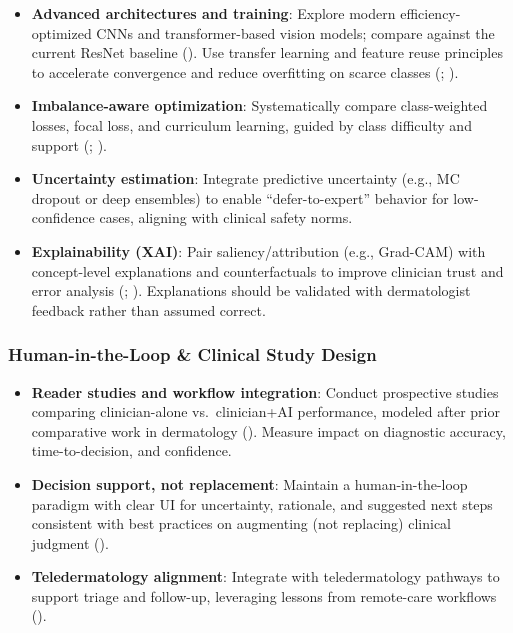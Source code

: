 \documentclass[
  12pt,
  oneside]{article}
\providecommand{\tightlist}{%
  \setlength{\itemsep}{0pt}\setlength{\parskip}{0pt}}
\begin{document}
\begin{itemize}
\tightlist
\item
  \textbf{Advanced architectures and training}: Explore modern
  efficiency-optimized CNNs and transformer-based vision models; compare
  against the current ResNet baseline (). Use transfer learning and feature reuse principles to
  accelerate convergence and reduce overfitting on scarce classes
  (;
  ).
\item
  \textbf{Imbalance-aware optimization}: Systematically compare
  class-weighted losses, focal loss, and curriculum learning, guided by
  class difficulty and support (; ).
\item
  \textbf{Uncertainty estimation}: Integrate predictive uncertainty
  (e.g., MC dropout or deep ensembles) to enable ``defer-to-expert''
  behavior for low-confidence cases, aligning with clinical safety
  norms.
\item
  \textbf{Explainability (XAI)}: Pair saliency/attribution (e.g.,
  Grad-CAM) with concept-level explanations and counterfactuals to
  improve clinician trust and error analysis
  (;
  ). Explanations
  should be validated with dermatologist feedback rather than assumed
  correct.
\end{itemize}

\subsubsection{Human-in-the-Loop \& Clinical Study
Design}\label{human-in-the-loop-clinical-study-design}

\begin{itemize}
\tightlist
\item
  \textbf{Reader studies and workflow integration}: Conduct prospective
  studies comparing clinician-alone vs.~clinician+AI performance,
  modeled after prior comparative work in dermatology
  (). Measure
  impact on diagnostic accuracy, time-to-decision, and confidence.
\item
  \textbf{Decision support, not replacement}: Maintain a
  human-in-the-loop paradigm with clear UI for uncertainty, rationale,
  and suggested next steps consistent with best practices on augmenting
  (not replacing) clinical judgment
  ().
\item
  \textbf{Teledermatology alignment}: Integrate with teledermatology
  pathways to support triage and follow-up, leveraging lessons from
  remote-care workflows ().
\end{itemize}
\end{document}
